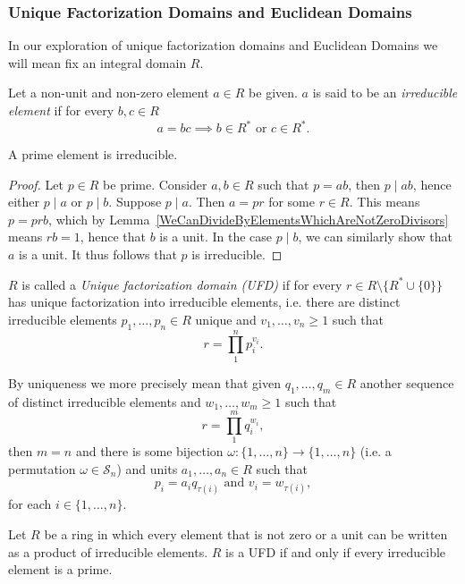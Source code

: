 \subsubsection{Unique Factorization Domains and Euclidean Domains}
In our exploration of unique factorization domains and Euclidean Domains we will mean fix an integral domain $R$.
\begin{definition}
    Let a non-unit and non-zero element $a\in R$ be given. $a$ is said to be an \textit{irreducible element} if for every $b,c\in R$
    $$a = bc \implies b\in R^\ast \text{ or } c \in R^\ast.$$
\end{definition}
\begin{lemma}
    A prime element is irreducible.
\end{lemma}
\begin{proof}
    Let $p\in R$ be prime. Consider $a,b\in R$ such that $p=ab$, then $p\mid ab$, hence either $p\mid a$ or $p\mid b$. Suppose $p\mid a$. Then $a = pr$ for some $r\in R$. This means $p = prb$, which by Lemma~\ref{WeCanDivideByElementsWhichAreNotZeroDivisors} means $rb = 1$, hence that $b$ is a unit. In the case $p\mid b$, we can similarly show that $a$ is a unit. It thus follows that $p$ is irreducible. 
\end{proof}
\begin{definition}
    $R$ is called a \textit{Unique factorization domain (UFD)} if for every $r\in R\setminus\{ R^\ast\cup \{0\}\}$ has unique factorization into irreducible elements, i.e. there are distinct irreducible elements $p_1,\dots,p_n\in R$ unique and $v_1,\dots,v_n\geq 1$ such that 
    $$r = \prod_1^n p_i^{v_i}.$$
\end{definition}
\begin{remark}
    By uniqueness we more precisely mean that given $q_1,\dots, q_m\in R$ another sequence of distinct irreducible elements and $w_1,\dots,w_m\geq 1$ such that 
    $$r = \prod_1^m q_i^{w_i},$$
    then $m=n$ and there is some bijection $\omega : \{1,\dots, n\} \rightarrow \{1,\dots,n\}$ (i.e. a permutation $\omega \in\mathcal{S}_n$) and units $a_1,\dots,a_n\in R$ such that 
    $$p_i = a_i q_{\tau(i)} \text{ and } v_i = w_{\tau(i)},$$
    for each $i\in\{1,\dots,n\}.$
\end{remark}
\begin{proposition}\label{EquivalentFormulationOfUFD}
    Let $R$ be a ring in which every element that is not zero or a unit can be written as a product of irreducible elements. $R$ is a UFD if and only if every irreducible element is a prime.
\end{proposition}
